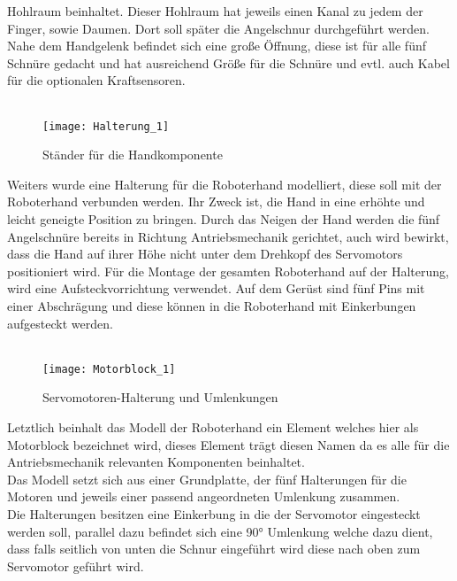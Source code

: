 \documentclass[titlepage,12pt,twoside]{article}
\begin{document}
Hohlraum beinhaltet. Dieser Hohlraum hat jeweils einen Kanal zu jedem der Finger, 
sowie Daumen. Dort soll später die Angelschnur durchgeführt werden. Nahe dem 
Handgelenk befindet sich eine große Öffnung, diese ist für alle fünf Schnüre 
gedacht und hat ausreichend Größe für die Schnüre und evtl. auch Kabel für die 
optionalen Kraftsensoren. \\
\\
\begin{figure}[H]
	\begin{center}
		\scalebox{0.8}
		{\texttt{[image: Halterung\_1]}}
		\caption{Ständer für die Handkomponente}
		\label{fig:Halterung_1}		
	\end{center}
\end{figure}
\hfill \break
Weiters wurde eine Halterung für die Roboterhand modelliert, diese soll mit 
der Roboterhand verbunden werden. Ihr Zweck ist, die Hand in eine erhöhte und 
leicht geneigte Position zu bringen. Durch das Neigen der Hand werden die fünf 
Angelschnüre bereits in Richtung Antriebsmechanik gerichtet, auch wird bewirkt, 
dass die Hand auf ihrer Höhe nicht unter dem Drehkopf des Servomotors positioniert 
wird. Für die Montage der gesamten Roboterhand auf der Halterung, wird eine 
Aufsteckvorrichtung verwendet. Auf dem Gerüst sind fünf Pins mit einer 
Abschrägung und diese können in die Roboterhand mit Einkerbungen aufgesteckt 
werden. \\
\\
\begin{figure}[H]
	\begin{center}
		\scalebox{0.8}
		{\texttt{[image: Motorblock\_1]}}
		\caption{Servomotoren-Halterung und Umlenkungen}
		\label{fig:Motorblock_1}			
	\end{center}
\end{figure}
\hfill \break
Letztlich beinhalt das Modell der Roboterhand ein Element welches hier als 
Motorblock bezeichnet wird, dieses Element trägt diesen Namen da es alle 
für die Antriebsmechanik relevanten Komponenten beinhaltet. \\
Das Modell setzt sich aus einer Grundplatte, der fünf Halterungen für die 
Motoren und jeweils einer passend angeordneten Umlenkung zusammen. \\
Die Halterungen besitzen eine Einkerbung in die der Servomotor eingesteckt 
werden soll, parallel dazu befindet sich eine 90° Umlenkung welche dazu dient, 
dass falls seitlich von unten die Schnur eingeführt wird diese nach oben zum 
Servomotor geführt wird. \\
\end{document}
